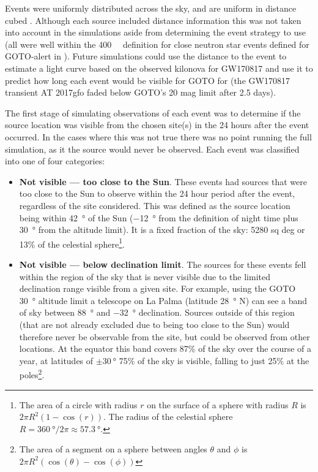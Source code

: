 \begin{colsection}
\begin{colsection}
Events were uniformly distributed across the sky, and are uniform in distance cubed \citep{First2Years}. Although each source included distance information this was not taken into account in the simulations aside from determining the event strategy to use (all were well within the \SI{400}{\mega\parsec} definition for close neutron star events defined for GOTO-alert in ). Future simulations could use the distance to the event to estimate a light curve based on the observed kilonova for GW170817 \citep{GW170817_followup} and use it to predict how long each event would be visible for GOTO for (the GW170817 transient AT 2017gfo faded below GOTO's 20 mag limit after 2.5 days).

\newpage

The first stage of simulating observations of each event was to determine if the source location was visible from the chosen site(s) in the 24 hours after the event occurred. In the cases where this was not true there was no point running the full simulation, as it the source would never be observed. Each event was classified into one of four categories: %

\begin{itemize}
    \item \textbf{Not visible --- too close to the Sun}. These events had sources that were too close to the Sun to observe within the 24 hour period after the event, regardless of the site considered. This was defined as the source location being within \SI{42}{\degree} of the Sun (\SI{-12}{\degree} from the definition of night time plus \SI{30}{\degree} from the altitude limit). It is a fixed fraction of the sky: 5280 sq deg or 13\% of the celestial sphere\footnote{The area of a circle with radius $r$ on the surface of a sphere with radius $R$ is $2\pi R^2(1-\cos(r))$. The radius of the celestial sphere $R=\SI{360}{\degree}/2\pi \approx \SI{57.3}{\degree}$.}.

    \item \textbf{Not visible --- below declination limit}. The sources for these events fell within the region of the sky that is never visible due to the limited declination range visible from a given site. For example, using the GOTO \SI{30}{\degree} altitude limit a telescope on La Palma (latitude \SI{28}{\degree} N) can see a band of sky between \SI{+88}{\degree} and \SI{-32}{\degree} declination. Sources outside of this region (that are not already excluded due to being too close to the Sun) would therefore never be observable from the site, but could be observed from other locations. At the equator this band covers 87\% of the sky over the course of a year, at latitudes of $\pm \SI{30}{\degree}$ 75\% of the sky is visible, falling to just 25\% at the poles\footnote{The area of a segment on a sphere between angles $\theta$ and $\phi$ is $2 \pi R^2 (\cos(\theta)-\cos(\phi))$}.


\end{itemize}
\end{colsection}
\end{colsection}
